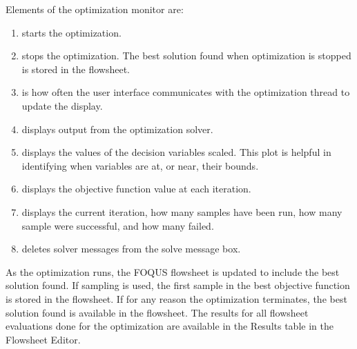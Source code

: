Elements of the optimization monitor are:
\begin{enumerate}
	\item {} starts the optimization.
	\item {} stops the optimization. The best solution found when optimization is stopped is stored in the flowsheet.
	\item {} is how often the user interface communicates with the optimization thread to update the display.
	\item {} displays output from the optimization solver.
	\item {} displays the values of the decision variables scaled. This plot is helpful in identifying when variables are at, or near, their bounds.
	\item {} displays the objective function value at each iteration.
	\item {} displays the current iteration, how many samples have been run, how many sample were successful, and how many failed.
	\item {} deletes solver messages from the solve message box.
\end{enumerate}

As the optimization runs, the FOQUS flowsheet is updated to include the best solution found. If sampling is used, the first sample in the best objective function is stored in the flowsheet. If for any reason the optimization terminates, the best solution found is available in the flowsheet. The results for all flowsheet evaluations done for the optimization are available in the Results table in the Flowsheet Editor.

